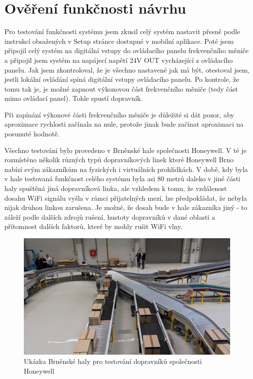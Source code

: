 \chapter{Ověření funkčnosti návrhu}
Pro testování funkčnosti systému jsem zkusil celý systém nastavit přesně podle instrukcí obsažených v Setup stránce dostupné v mobilní aplikace. Poté jsem připojil celý systém na digitální vstupy do ovládacího panelu frekvenčního měniče a připojil jsem systém na napájecí napětí 24V OUT vycházející z ovládacího panelu. Jak jsem zkontroloval, že je všechno nastavené jak má být, otestoval jsem, jestli lokální ovládání spíná digitální vstupy ovládacího panelu. Po kontrole, že tomu tak je, je možné zapnout výkonovou část frekvenčního měniče (tedy část mimo ovládací panel). Tohle spustí dopravník.

Při zapínání výkonové části frekvenčního měniče je důležité si dát pozor, aby aproximace rychlosti začínala na nule, protože jinak bude začínat aproximaci na posunuté hodnotě.

Všechno testování bylo provedeno v Brněnské hale společnosti Honeywell. V té je rozmístěno několik různých typů dopravníkových linek které Honeywell Brno nabízí svým zákazníkům na fyzických i virtuálních prohlídkách. V době, kdy byla v hale testovaná funkčnost celého systému byla asi 80 metrů daleko v jiné části haly spuštěná jiná dopravníková linka, ale vzhledem k tomu, že vzdálenost dosahu WiFi signálu vyšla v rámci přijatelných mezí, lze předpokládat, že nebyla nijak druhou linkou zarušena. Je možné, že dosah bude v hale zákazníka jiný - to záleží podle dalších zdrojů rušení, hustoty dopravníků v dané oblasti a přítomnost dalších faktorů, které by mohly rušit WiFi vlny.

\begin{figure}
    \centering
    \includegraphics[width=1\linewidth]{images/BrnenskaHoneywellHala.png}
    \caption{Ukázka Brněnské haly pro testování dopravníků společnosti Honeywell \cite{HoneywellHala}}
    \label{fig:BrnenskaHoneywellHala}
\end{figure}


